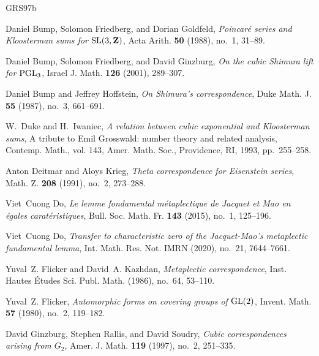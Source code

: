 \begin{thebibliography}{GRS97b}

Daniel Bump, Solomon Friedberg, and Dorian Goldfeld, \emph{Poincar\'e series
  and {K}loosterman sums for {${\rm SL}(3,{\bf Z})$}}, Acta Arith. \textbf{50}
  (1988), no.~1, 31--89. 

Daniel Bump, Solomon Friedberg, and David Ginzburg, \emph{On the cubic
  {S}himura lift for {${\rm PGL}_3$}}, Israel J. Math. \textbf{126} (2001),
  289--307. 

Daniel Bump and Jeffrey Hoffstein, \emph{On {S}himura's correspondence}, Duke
  Math. J. \textbf{55} (1987), no.~3, 661--691. 

W.~Duke and H.~Iwaniec, \emph{A relation between cubic exponential and
  {K}loosterman sums}, A tribute to {E}mil {G}rosswald: number theory and
  related analysis, Contemp. Math., vol. 143, Amer. Math. Soc., Providence, RI,
  1993, pp.~255--258. 

Anton Deitmar and Aloys Krieg, \emph{Theta correspondence for {E}isenstein
  series}, Math. Z. \textbf{208} (1991), no.~2, 273--288. 
  
Viet~Cuong Do, \emph{Le lemme fondamental m\'etaplectique de Jacquet et Mao en \'egales 
carat\'eristiques}, Bull. Soc. Math. Fr. \textbf{143} (2015), no.~1, 125--196.

Viet~Cuong Do, \emph{Transfer to characteristic zero of the {J}acquet-{M}ao's
  metaplectic fundamental lemma}, Int. Math. Res. Not. IMRN (2020), no.~21,
  7644--7661. 

Yuval~Z. Flicker and David~A. Kazhdan, \emph{Metaplectic correspondence}, Inst.
  Hautes \'Etudes Sci. Publ. Math. (1986), no.~64, 53--110. 

Yuval~Z. Flicker, \emph{Automorphic forms on covering groups of {${\rm
  GL}(2)$}}, Invent. Math. \textbf{57} (1980), no.~2, 119--182. 

David Ginzburg, Stephen Rallis, and David Soudry, \emph{Cubic correspondences
  arising from {$G_2$}}, Amer. J. Math. \textbf{119} (1997), no.~2, 251--335.


\end{thebibliography}
